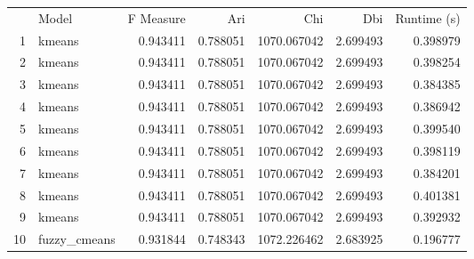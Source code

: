 \begin{tabular}{rlrrrrr}
 & Model & F Measure & Ari & Chi & Dbi & Runtime (s) \\
1 & kmeans & 0.943411 & 0.788051 & 1070.067042 & 2.699493 & 0.398979 \\
2 & kmeans & 0.943411 & 0.788051 & 1070.067042 & 2.699493 & 0.398254 \\
3 & kmeans & 0.943411 & 0.788051 & 1070.067042 & 2.699493 & 0.384385 \\
4 & kmeans & 0.943411 & 0.788051 & 1070.067042 & 2.699493 & 0.386942 \\
5 & kmeans & 0.943411 & 0.788051 & 1070.067042 & 2.699493 & 0.399540 \\
6 & kmeans & 0.943411 & 0.788051 & 1070.067042 & 2.699493 & 0.398119 \\
7 & kmeans & 0.943411 & 0.788051 & 1070.067042 & 2.699493 & 0.384201 \\
8 & kmeans & 0.943411 & 0.788051 & 1070.067042 & 2.699493 & 0.401381 \\
9 & kmeans & 0.943411 & 0.788051 & 1070.067042 & 2.699493 & 0.392932 \\
10 & fuzzy_cmeans & 0.931844 & 0.748343 & 1072.226462 & 2.683925 & 0.196777 \\
\end{tabular}
